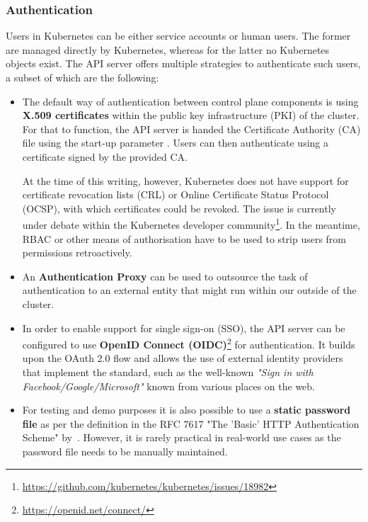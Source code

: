 \subsubsection{Authentication} \label{authentication}

Users in Kubernetes can be either service accounts or human users. The former are managed directly by Kubernetes, whereas for the latter no Kubernetes objects exist. The API server offers multiple strategies to authenticate such users, a subset of which are the following:

\begin{itemize}
    \item The default way of authentication between control plane components is using \textbf{X.509 certificates} within the public key infrastructure (PKI) of the cluster. For that to function, the API server is handed the Certificate Authority (CA) file using the start-up parameter . Users can then authenticate using a certificate signed by the provided CA. 
    
    At the time of this writing, however, Kubernetes does not have support for certificate revocation lists (CRL) or Online Certificate Status Protocol (OCSP), with which certificates could be revoked. The issue is currently under debate within the Kubernetes developer community\footnote{\url{https://github.com/kubernetes/kubernetes/issues/18982}}. In the meantime, RBAC or other means of authorisation have to be used to strip users from permissions retroactively.

    \item An \textbf{Authentication Proxy} can be used to outsource the task of authentication to an external entity that might run within our outside of the cluster.
    
    \item In order to enable support for single sign-on (SSO), the API server can be configured to use \textbf{OpenID Connect (OIDC)}\footnote{\url{https://openid.net/connect/}} for authentication. It builds upon the OAuth 2.0 flow and allows the use of external identity providers that implement the standard, such as the well-known \textit{"Sign in with Facebook/Google/Microsoft"} known from various places on the web. 

   \item For testing and demo purposes it is also possible to use a \textbf{static password file} as per the definition in the RFC 7617 "The 'Basic' HTTP Authentication Scheme" by~\textcite{RFC7617}. However, it is rarely practical in real-world use cases as the password file needs to be manually maintained.
	
\end{itemize}

